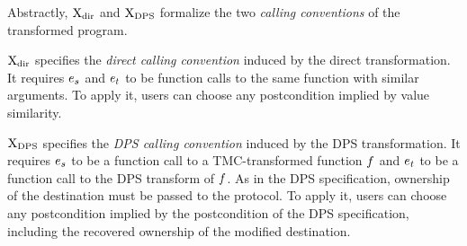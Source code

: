 \medskip

Abstractly, $\iProt_$ and $\iProt_$ formalize the two \emph{calling conventions} of the transformed program.

$\iProt_$ specifies the \emph{direct calling convention} induced by the direct transformation.
It requires $\datalangExpr_s$ and $\datalangExpr_t$ to be function calls to the same function with similar arguments.
To apply it, users can choose any postcondition implied by value similarity.

$\iProt_$ specifies the \emph{DPS calling convention} induced by the DPS transformation.
It requires $\datalangExpr_s$ to be a function call to a TMC-transformed function $\datalangFn$ and $\datalangExpr_t$ to be a function call to the DPS transform of $\datalangFn$.
As in the DPS specification, ownership of the destination must be passed to the protocol.
To apply it, users can choose any postcondition implied by the postcondition of the DPS specification, including the recovered ownership of the modified destination.

